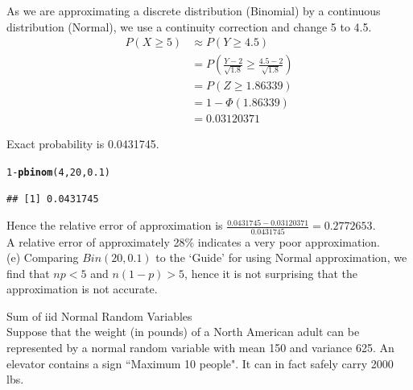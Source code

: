 \documentclass[bigtut]{tutorial}\usepackage[]{graphicx}\usepackage[]{color}
\makeatletter
\newcommand{\hlnum}[1]{\textcolor[rgb]{0.686,0.059,0.569}{#1}}%
\newcommand{\hlopt}[1]{\textcolor[rgb]{0,0,0}{#1}}%
\newcommand{\hlstd}[1]{\textcolor[rgb]{0.345,0.345,0.345}{#1}}%
\newcommand{\hlkwd}[1]{\textcolor[rgb]{0.737,0.353,0.396}{\textbf{#1}}}%
\newenvironment{kframe}{%
 \def\at@end@of@kframe{}%
 \ifinner\ifhmode%
  \def\at@end@of@kframe{\end{minipage}}%
  \begin{minipage}{\columnwidth}%
 \fi\fi%
 \def\FrameCommand##1{\hskip\@totalleftmargin \hskip-\fboxsep
 \colorbox{shadecolor}{##1}\hskip-\fboxsep
     \hskip-\linewidth \hskip-\@totalleftmargin \hskip\columnwidth}%
 \MakeFramed {\advance\hsize-\width
   \@totalleftmargin\z@ \linewidth\hsize
   \@setminipage}}%
 {\par\unskip\endMakeFramed%
 \at@end@of@kframe}
\newenvironment{knitrout}{}{} %
\makeatother
\begin{document}
\begin{tutorial}
\begin{questions}
\begin{solution}
As we are approximating a discrete distribution (Binomial) by a continuous distribution (Normal), we use a continuity correction and  change 5 to 4.5.
\begin{align*} 
P(X \geq 5) & \approx P(Y \geq 4.5) \\
& = P( \frac {Y - 2}{\sqrt{1.8}} \geq \frac{4.5-2}{\sqrt{1.8}} ) \\
& = P(Z \geq 1.86339 ) \\
& = 1-\Phi(1.86339) \\
& = 0.03120371
\end{align*}

Exact probability is 0.0431745.
\begin{knitrout}
\color{fgcolor}\begin{kframe}
\begin{alltt}
\hlnum{1}\hlopt{-}\hlkwd{pbinom}\hlstd{(}\hlnum{4}\hlstd{,}\hlnum{20}\hlstd{,}\hlnum{0.1}\hlstd{)}
\end{alltt}
\begin{verbatim}
## [1] 0.0431745
\end{verbatim}
\end{kframe}
\end{knitrout}

Hence the relative error of approximation is $\frac{0.0431745 -  0.03120371}{0.0431745} = 0.2772653$. \\
A relative error of approximately 28\% indicates a very poor approximation.  \\

(e) Comparing $Bin(20,0.1)$ to the `Guide' for using Normal approximation, we find that $np <5$ and $n(1-p)  >5$, hence it is not surprising that the approximation is not accurate.
\end{solution}

\question Sum of iid Normal Random Variables \\

Suppose that the weight (in pounds) of a North American
adult can be represented by a normal random variable with mean
150 and variance 625. An elevator contains a sign ``Maximum 10 people". It can in fact safely carry 2000 lbs. \\
                        
\end{questions}
\end{tutorial}
\end{document}
